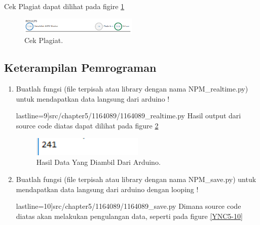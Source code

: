 \begin{enumerate}
Cek Plagiat dapat dilihat pada figire \ref{YNC5-CekPlagiat}

	\begin{figure}[!htbp]
		\centerline{\includegraphics[width=0.5\textwidth]{figures/chapter5/1164089/YNC5-CekPlagiat.png}}
		\caption{Cek Plagiat.}
		\label{YNC5-CekPlagiat}
	\end{figure}		

\end{enumerate}

\subsection{Keterampilan Pemrograman}
\begin{enumerate}

\item Buatlah fungsi (file terpisah atau library dengan nama NPM\_realtime.py) untuk mendapatkan data langsung dari arduino !

	 lastline=9]{src/chapter5/1164089/1164089_realtime.py} 
	\subitem Hasil output dari source code diatas dapat dilihat pada figure \ref{YNC5-9}

	\begin{figure}[!htbp]
		\centerline{\includegraphics[width=0.5\textwidth]{figures/chapter5/1164089/YNC5-9.png}}
		\caption{Hasil Data Yang Diambil Dari Arduino.}
		\label{YNC5-9}
	\end{figure}

\item Buatlah fungsi (file terpisah atau library dengan nama NPM\_save.py) untuk mendapatkan data langsung dari arduino dengan looping !

	 lastline=10]{src/chapter5/1164089/1164089_save.py}
	\subitem Dimana source code diatas akan melakukan pengulangan data, seperti pada figure \ref{YNC5-10}


\end{enumerate}
